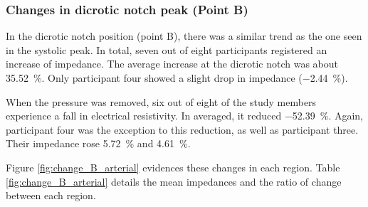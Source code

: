 \subsubsection{Changes in dicrotic notch peak (Point B)}
\label{section5.3.2.2}
In the dicrotic notch position (point B), there was a similar trend as the one seen in the systolic peak. In total, seven out of eight participants registered an increase of impedance. The average increase at the dicrotic notch was about \SI{35.52}{\percent}. Only participant four showed a  slight drop in impedance (\SI{-2.44}{\percent}).  

When the pressure was removed, six out of eight of the study members experience a fall in electrical resistivity. In averaged, it reduced \SI{-52.39}{\percent}. Again, participant four was the exception to this reduction, as well as participant three. Their impedance rose \SI{5.72}{\percent} and \SI{4.61}{\percent}.

Figure \ref{fig:change_B_arterial} evidences these changes in each region. Table \ref{fig:change_B_arterial} details the mean impedances and the ratio of change between each region.

